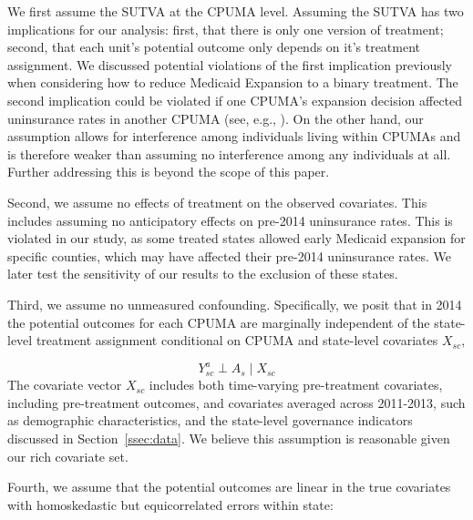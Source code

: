 \documentclass[aoas]{imsart}
\theoremstyle{plain}
\theoremstyle{remark}
\begin{document}
We first assume the SUTVA at the CPUMA level. Assuming the SUTVA has two implications for our analysis: first, that there is only one version of treatment; second, that each unit's potential outcome only depends on it's treatment assignment. We discussed potential violations of the first implication previously when considering how to reduce Medicaid Expansion to a binary treatment. The second implication could be violated if one CPUMA's expansion decision affected uninsurance rates in another CPUMA (see, e.g., \cite{frean2017premium}). On the other hand, our assumption allows for interference among individuals living within CPUMAs and is therefore weaker than assuming no interference among any individuals at all. Further addressing this is beyond the scope of this paper.

Second, we assume no effects of treatment on the observed covariates. This includes assuming no anticipatory effects on pre-2014 uninsurance rates. This is violated in our study, as some treated states allowed early Medicaid expansion for specific counties, which may have affected their pre-2014 uninsurance rates. We later test the sensitivity of our results to the exclusion of these states.

Third, we assume no unmeasured confounding. Specifically, we posit that in 2014 the potential outcomes for each CPUMA are marginally independent of the state-level treatment assignment conditional on CPUMA and state-level covariates $X_{sc}$, 

\begin{equation}\label{eqn:unconfoundedness}
Y_{sc}^a \perp A_s \mid X_{sc}
\end{equation}
The covariate vector $X_{sc}$ includes both time-varying pre-treatment covariates, including pre-treatment outcomes, and covariates averaged across 2011-2013, such as demographic characteristics, and the state-level governance indicators discussed in Section~\ref{ssec:data}. We believe this assumption is reasonable given our rich covariate set. 

Fourth, we assume that the potential outcomes are linear in the true covariates with homoskedastic but equicorrelated errors within state:
\end{document}
